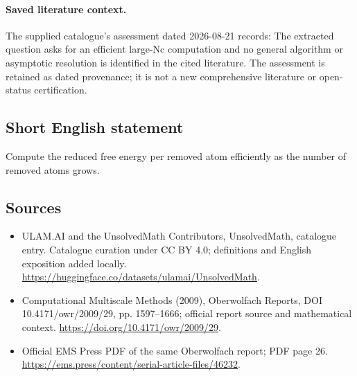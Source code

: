 \documentclass[11pt]{article}
\begin{document}
\paragraph{Saved literature context.} The supplied catalogue's assessment dated 2026-08-21 records: The extracted question asks for an efficient large-Nc computation and no general algorithm or asymptotic resolution is identified in the cited literature. The assessment is retained as dated provenance; it is not a new comprehensive literature or open-status certification.
\subsection{Short English statement}
Compute the reduced free energy per removed atom efficiently as the number of removed atoms grows.
\subsection{Sources}
\begin{itemize}
\item[\hypertarget{source:statement:1}{S1}] ULAM.AI and the UnsolvedMath Contributors, UnsolvedMath, catalogue entry. Catalogue curation under CC BY 4.0; definitions and English exposition added locally.
\url{https://huggingface.co/datasets/ulamai/UnsolvedMath}.
\item[\hypertarget{source:statement:2}{S2}] Computational Multiscale Methods (2009), Oberwolfach Reports, DOI 10.4171/owr/2009/29, pp. 1597--1666; official report source and mathematical context.
\url{https://doi.org/10.4171/owr/2009/29}.
\item[\hypertarget{source:statement:3}{S3}] Official EMS Press PDF of the same Oberwolfach report; PDF page 26.
\url{https://ems.press/content/serial-article-files/46232}.
\end{itemize}
\label{end:statement}
\end{document}
